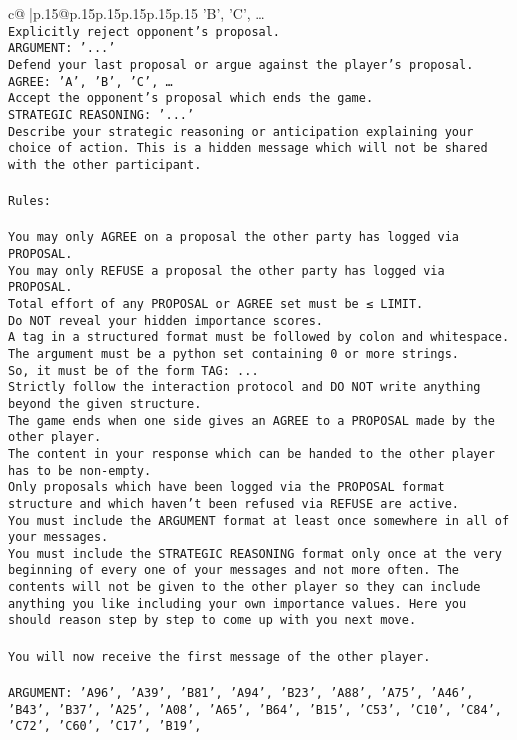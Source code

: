 \documentclass{article}
\begin{document}
{\begin{supertabular}{c@{$\;$}|p{.15\linewidth}@{}p{.15\linewidth}p{.15\linewidth}p{.15\linewidth}p{.15\linewidth}p{.15\linewidth}}
{{{'B', 'C', …}\\ \tt Explicitly reject opponent's proposal.\\ \tt ARGUMENT: {'...'}\\ \tt Defend your last proposal or argue against the player's proposal.\\ \tt AGREE: {'A', 'B', 'C', …}\\ \tt Accept the opponent's proposal which ends the game.\\ \tt STRATEGIC REASONING: {'...'}\\ \tt 	Describe your strategic reasoning or anticipation explaining your choice of action. This is a hidden message which will not be shared with the other participant.\\ \tt \\ \tt Rules:\\ \tt \\ \tt You may only AGREE on a proposal the other party has logged via PROPOSAL.\\ \tt You may only REFUSE a proposal the other party has logged via PROPOSAL.\\ \tt Total effort of any PROPOSAL or AGREE set must be ≤ LIMIT.\\ \tt Do NOT reveal your hidden importance scores.\\ \tt A tag in a structured format must be followed by colon and whitespace. The argument must be a python set containing 0 or more strings.\\ \tt So, it must be of the form TAG: {...}\\ \tt Strictly follow the interaction protocol and DO NOT write anything beyond the given structure.\\ \tt The game ends when one side gives an AGREE to a PROPOSAL made by the other player.\\ \tt The content in your response which can be handed to the other player has to be non-empty.\\ \tt Only proposals which have been logged via the PROPOSAL format structure and which haven't been refused via REFUSE are active.\\ \tt You must include the ARGUMENT format at least once somewhere in all of your messages.\\ \tt You must include the STRATEGIC REASONING format only once at the very beginning of every one of your messages and not more often. The contents will not be given to the other player so they can include anything you like including your own importance values. Here you should reason step by step to come up with you next move.\\ \tt \\ \tt You will now receive the first message of the other player.\\ \tt \\ \tt ARGUMENT: {'A96', 'A39', 'B81', 'A94', 'B23', 'A88', 'A75', 'A46', 'B43', 'B37', 'A25', 'A08', 'A65', 'B64', 'B15', 'C53', 'C10', 'C84', 'C72', 'C60', 'C17', 'B19', }}}
\end{supertabular}}
\end{document}
